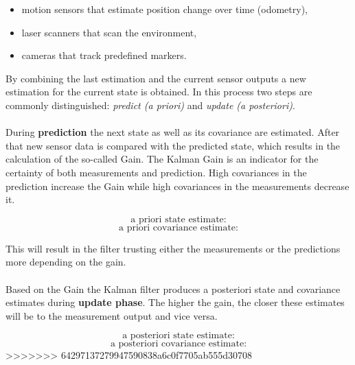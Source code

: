 \begin{itemize}
\item motion sensors that estimate position change over time (odometry),
\item laser scanners that scan the environment,
\item cameras that track predefined markers. 
\end{itemize}

By combining the last estimation and the current sensor outputs a new estimation for the current state is obtained. In this process two steps are commonly distinguished: \textit{predict (a priori)} and \textit{update (a posteriori)}.
\\\\
During \textbf{prediction} the next state as well as its covariance are estimated. After that new sensor data is compared with the predicted state, which results in the calculation of the so-called  Gain. The Kalman Gain is an indicator for the certainty of both measurements and prediction. High covariances in the prediction increase the Gain while high covariances in the measurements decrease it.

$$\text{a priori state estimate:} $$
$$\text{a priori covariance estimate:} $$

This will result in the filter trusting either the measurements or the predictions more depending on the gain. 
\\\\
Based on the Gain the Kalman filter produces a posteriori state and covariance estimates during \textbf{update phase}. The higher the gain, the closer these estimates will be to the measurement output and vice versa.

$$\text{a posteriori state estimate:} $$
$$\text{a posteriori covariance estimate:} $$
>>>>>>> 64297137279947590838a6c0f7705ab555d30708
